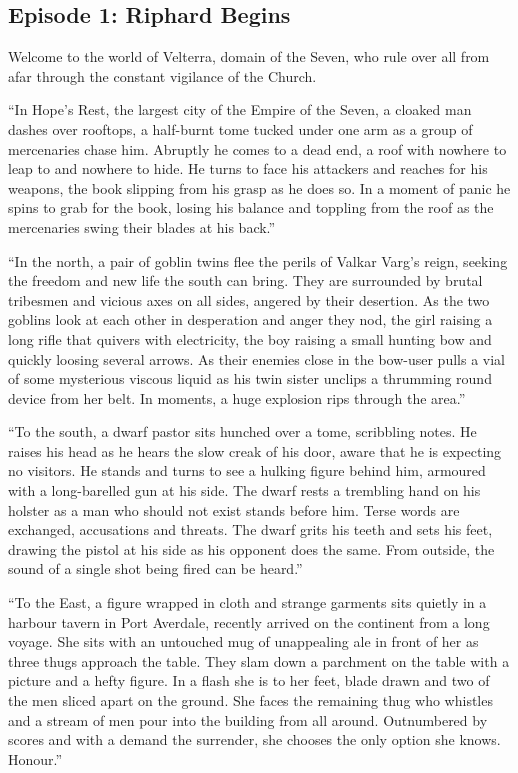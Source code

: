 \subsection{Episode 1: Riphard Begins}

Welcome to the world of Velterra, domain of the Seven, who rule over all from afar through the constant vigilance of the Church.\medskip

“In Hope’s Rest, the largest city of the Empire of the Seven, a cloaked man dashes over rooftops, a half-burnt tome tucked under one arm as a group of mercenaries chase him. Abruptly he comes to a dead end, a roof with nowhere to leap to and nowhere to hide. He turns to face his attackers and reaches for his weapons, the book slipping from his grasp as he does so. In a moment of panic he spins to grab for the book, losing his balance and toppling from the roof as the mercenaries swing their blades at his back.”\medskip

“In the north, a pair of goblin twins flee the perils of Valkar Varg’s reign, seeking the freedom and new life the south can bring. They are surrounded by brutal tribesmen and vicious axes on all sides, angered by their desertion. As the two goblins look at each other in desperation and anger they nod, the girl raising a long rifle that quivers with electricity, the boy raising a small hunting bow and quickly loosing several arrows. As their enemies close in the bow-user pulls a vial of some mysterious viscous liquid as his twin sister unclips a thrumming round device from her belt. In moments, a huge explosion rips through the area.”\medskip

“To the south, a dwarf pastor sits hunched over a tome, scribbling notes. He raises his head as he hears the slow creak of his door, aware that he is expecting no visitors. He stands and turns to see a hulking figure behind him, armoured with a long-barelled gun at his side. The dwarf rests a trembling hand on his holster as a man who should not exist stands before him. Terse words are exchanged, accusations and threats. The dwarf grits his teeth and sets his feet, drawing the pistol at his side as his opponent does the same. From outside, the sound of a single shot being fired can be heard.”\medskip

“To the East, a figure wrapped in cloth and strange garments sits quietly in a harbour tavern in Port Averdale, recently arrived on the continent from a long voyage. She sits with an untouched mug of unappealing ale in front of her as three thugs approach the table. They slam down a parchment on the table with a picture and a hefty figure. In a flash she is to her feet, blade drawn and two of the men sliced apart on the ground. She faces the remaining thug who whistles and a stream of men pour into the building from all around. Outnumbered by scores and with a demand the surrender, she chooses the only option she knows. Honour.”\medskip

